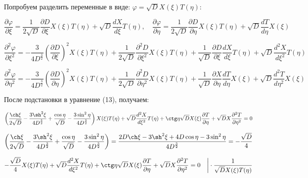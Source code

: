 \documentclass[a4paper,12pt]{article}
\begin{document}
	\quad Попробуем разделить переменные в виде: $\varphi = \sqrt{D} X(\xi) T(\eta)$:
	
	\begin{center}
		$\dfrac{\partial \varphi}{\partial \xi} = \dfrac{1}{2\sqrt{D}} \dfrac{\partial D}{\partial \xi} X(\xi) T(\eta) + \sqrt{D} \dfrac{d X}{d \xi} T(\eta), \quad \dfrac{\partial \varphi}{\partial \eta} = \dfrac{1}{2\sqrt{D}}\dfrac{\partial D}{\partial \eta} X(\xi)T(\eta) + \sqrt{D} \dfrac{dT}{d\eta}X(\xi)$
		
		$\dfrac{\partial^2 \varphi}{\partial \xi^2} = -\dfrac{3}{4D^{\frac{3}{2}}} \left(\dfrac{\partial D}{\partial \xi}\right)^2 X(\xi) T(\eta)  + \dfrac{1}{2\sqrt{D}} \dfrac{\partial^2 D}{\partial \xi^2} X(\xi) T(\eta) + \dfrac{1}{\sqrt{D}} \dfrac{\partial D}{\partial \xi} \dfrac{d X}{d \xi} T(\eta) + \sqrt{D}\dfrac{d^2 X}{d\xi^2} T(\eta)$
		
		$\dfrac{\partial^2 \varphi}{\partial \eta^2} = -\dfrac{3}{4D^{\frac{3}{2}}}\left(\dfrac{\partial D}{\partial \eta}\right)^2 X(\xi)T(\eta) + \dfrac{1}{2\sqrt{D}} \dfrac{\partial^2 D}{\partial \eta^2} X(\xi) T(\eta) + \dfrac{1}{\sqrt{D}} \dfrac{\partial X}{\partial \eta} \dfrac{dT}{d\eta} X(\xi) + \sqrt{D}\dfrac{d^2 T}{d\eta^2} X(\xi)$
	\end{center}
	
	\quad После подстановки в уравнение (13), получаем:
	
	\begin{equation}
		\left(\dfrac{\ch \xi}{2\sqrt{D}} - \dfrac{3\sh^2 \xi}{4D^{\frac{3}{2}}} + \dfrac{\cos \eta}{\sqrt{D}} - \dfrac{3\sin^2 \eta}{4D^{\frac{3}{2}}}\right)X(\xi)T(\eta) + \sqrt{D}\dfrac{d^2 X}{d\xi^2} T(\eta) + \ctg\eta \sqrt{D}X(\xi)\dfrac{\partial T}{\partial \eta} + \sqrt{D}X\dfrac{\partial^2 T}{\partial \eta^2} = 0
	\end{equation}
	
	\begin{center}
		$\left(\dfrac{\ch \xi}{2\sqrt{D}} - \dfrac{3\sh^2 \xi}{4D^{\frac{3}{2}}} + \dfrac{\cos \eta}{\sqrt{D}} - \dfrac{3\sin^2 \eta}{4D^{\frac{3}{2}}}\right) = \dfrac{2D\ch\xi - 3\sh^2\xi + 4D\cos\eta - 3\sin^2 \eta}{4D^{\frac{3}{2}}} = -\dfrac{\sqrt{D}}{4}$
	\end{center}
	
	\begin{center}
		$-\dfrac{\sqrt{D}}{4}X(\xi)T(\eta) + \sqrt{D}\dfrac{d^2 X}{d\xi^2} T(\eta) + \ctg\eta \sqrt{D}X(\xi)\dfrac{\partial T}{\partial \eta} + \sqrt{D}X\dfrac{\partial^2 T}{\partial \eta^2} = 0 \quad \bigg| \cdot \dfrac{1}{\sqrt{D}X(\xi)T(\eta)}$
	\end{center}
	
\end{document}
